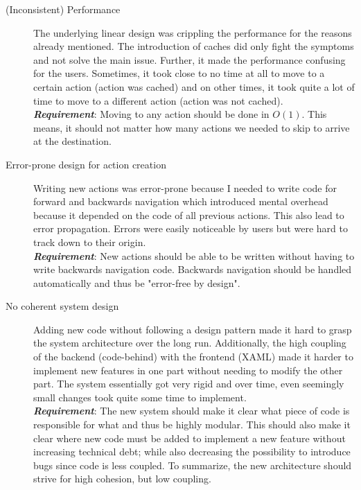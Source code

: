 \begin{description}
\item [(Inconsistent) Performance] The underlying linear design was crippling the performance for the reasons already mentioned. The introduction of caches did only fight the symptoms and not solve the main issue. Further, it made the performance confusing for the users. Sometimes, it took close to no time at all to move to a certain action (action was cached) and on other times, it took quite a lot of time to move to a different action (action was not cached). \\
\textit{\textbf{Requirement}}: Moving to any action should be done in $O(1)$. This means, it should not matter how many actions we needed to skip to arrive at the destination.
\item [Error-prone design for action creation] Writing new actions was error-prone because I needed to write code for forward and backwards navigation which introduced mental overhead because it depended on the code of all previous actions. This also lead to error propagation. Errors were easily noticeable by users but were hard to track down to their origin.\\
\textit{\textbf{Requirement}}: New actions should be able to be written without having to write backwards navigation code. Backwards navigation should be handled automatically and thus be "error-free by design".
\item [No coherent system design] Adding new code without following a design pattern made it hard to grasp the system architecture over the long run. Additionally, the high coupling of the backend (code-behind) with the frontend (XAML) made it harder to implement new features in one part without needing to modify the other part. The system essentially got very rigid and over time, even seemingly small changes took quite some time to implement.\\
\textit{\textbf{Requirement}}: The new system should make it clear what piece of code is responsible for what and thus be highly modular. This should also make it clear where new code must be added to implement a new feature without increasing technical debt; while also decreasing the possibility to introduce bugs since code is less coupled. To summarize, the new architecture should strive for high cohesion, but low coupling.
\end{description}


